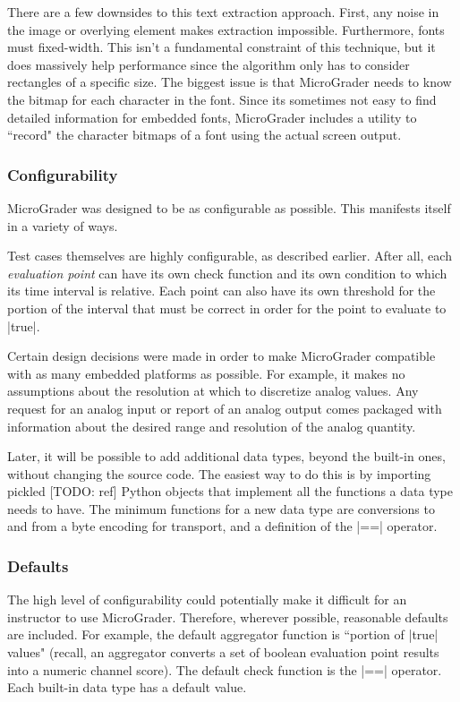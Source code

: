 \documentclass[12pt]{article}
\begin{document}
There are a few downsides to this text extraction approach.  First, any noise in the image or overlying element makes extraction impossible.  Furthermore, fonts must fixed-width.  This isn't a fundamental constraint of this technique, but it does massively help performance since the algorithm only has to consider rectangles of a specific size.  The biggest issue is that MicroGrader needs to know the bitmap for each character in the font.  Since its sometimes not easy to find detailed information for embedded fonts, MicroGrader includes a utility to ``record" the character bitmaps of a font using the actual screen output.

\subsubsection{Configurability}
MicroGrader was designed to be as configurable as possible.  This manifests itself in a variety of ways.

Test cases themselves are highly configurable, as described earlier.  After all, each \textit{evaluation point} can have its own check function and its own condition to which its time interval is relative.  Each point can also have its own threshold for the portion of the interval that must be correct in order for the point to evaluate to |true|.

Certain design decisions were made in order to make MicroGrader compatible with as many embedded platforms as possible.  For example, it makes no assumptions about the resolution at which to discretize analog values.  Any request for an analog input or report of an analog output comes packaged with information about the desired range and resolution of the analog quantity.

Later, it will be possible to add additional data types, beyond the built-in ones, without changing the source code.  The easiest way to do this is by importing pickled [TODO: ref] Python objects that implement all the functions a data type needs to have.  The minimum functions for a new data type are conversions to and from a byte encoding for transport, and a definition of the |==| operator.

\subsubsection{Defaults}
The high level of configurability could potentially make it difficult for an instructor to use MicroGrader.  Therefore, wherever possible, reasonable defaults are included.  For example, the default aggregator function is ``portion of |true| values" (recall, an aggregator converts a set of boolean evaluation point results into a numeric channel score).  The default check function is the |==| operator.  Each built-in data type has a default value.
\end{document}
